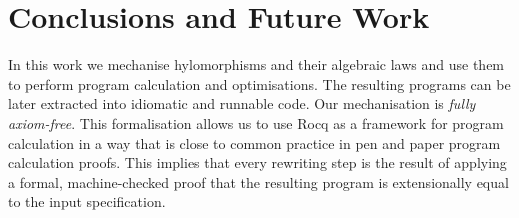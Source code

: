 \documentclass[a4paper,UKenglish,cleveref, autoref, thm-restate]{lipics-v2021}
\newcommand{\haskell}[1]{\texttt{#1}}
\begin{document}



\section{Conclusions and Future Work}
In this work we mechanise hylomorphisms and their algebraic laws and use them to
perform program calculation and optimisations. The resulting programs can be
later extracted into idiomatic and runnable code. Our mechanisation is
\emph{fully axiom-free}. This formalisation allows us to use Rocq as a framework
for program calculation in a way that is close to common practice in pen and
paper program calculation proofs. This implies that every rewriting step is the
result of applying a formal, machine-checked proof that the resulting program is
extensionally equal to the input specification.
\end{document}
